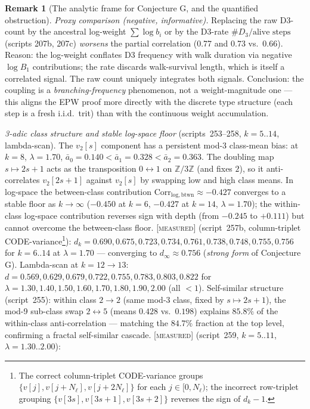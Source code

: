 \documentclass[11pt]{article}
\theoremstyle{definition}
\newtheorem{remark}[theorem]{Remark}
\newcommand{\MEASURED}{\textup{[\textsc{measured}]}}
\begin{document}
\begin{remark}[The analytic frame for Conjecture G, and the quantified
obstruction]
\emph{Proxy comparison (negative, informative).} Replacing the raw D3-count
by the ancestral log-weight $\sum \log b_i$ or by the D3-rate $\#D_3 /
\text{alive steps}$ (scripts 207b, 207c) \emph{worsens} the partial
correlation (0.77 and 0.73 vs.\ 0.66). Reason: the log-weight conflates
D3 frequency with walk duration via negative $\log B_1$ contributions;
the rate discards walk-survival length, which is itself a correlated
signal. The raw count uniquely integrates both signals. Conclusion: the
coupling is a \emph{branching-frequency} phenomenon, not a
weight-magnitude one --- this aligns the EPW proof more directly with the
discrete type structure (each step is a fresh i.i.d.\ trit) than with
the continuous weight accumulation.

\emph{3-adic class structure and stable log-space floor}
(scripts~253--258, $k{=}5..14$, lambda-scan).
The $v_2[s]$ component has a persistent mod-$3$ class-mean bias:
at $k{=}8$, $\lambda{=}1.70$, $\bar a_0 = 0.140 < \bar a_1 = 0.328 < \bar a_2 = 0.363$.
The doubling map $s\mapsto 2s{+}1$ acts as the transposition $0\leftrightarrow 1$
on $\mathbb{Z}/3\mathbb{Z}$ (and fixes $2$), so it anti-correlates
$v_2[2s{+}1]$ against $v_2[s]$ by swapping low and high class means.
In log-space the between-class contribution
$\mathrm{Corr}_{\mathrm{log,btwn}} \approx -0.427$
converges to a stable floor as $k\to\infty$ ($-0.450$ at $k{=}6$,
$-0.427$ at $k{=}14$, $\lambda{=}1.70$); the within-class log-space
contribution reverses sign with depth (from $-0.245$ to $+0.111$) but
cannot overcome the between-class floor.
\MEASURED{} (script~257b, column-triplet CODE-variance\footnote{The
correct column-triplet CODE-variance groups
$\{v[j],v[j{+}N_\ell],v[j{+}2N_\ell]\}$ for each $j\in[0,N_\ell)$;
the incorrect row-triplet grouping $\{v[3s],v[3s{+}1],v[3s{+}2]\}$
reverses the sign of $d_k - 1$.}):
$d_k = 0.690, 0.675, 0.723, 0.734, 0.761, 0.738, 0.748, 0.755, 0.756$
for $k=6..14$ at $\lambda{=}1.70$ --- converging to $d_\infty \approx 0.756$
(\emph{strong form} of Conjecture G).
Lambda-scan at $k{=}12{\to}13$: $d = 0.569, 0.629, 0.679, 0.722, 0.755,
0.783, 0.803, 0.822$ for $\lambda = 1.30, 1.40, 1.50, 1.60, 1.70, 1.80,
1.90, 2.00$ (all $< 1$).
Self-similar structure (script~255): within class $2{\to}2$ (same mod-3
class, fixed by $s\mapsto 2s{+}1$), the mod-9 sub-class swap
$2\leftrightarrow 5$ (means $0.428$ vs.\ $0.198$) explains $85.8\%$ of
the within-class anti-correlation --- matching the $84.7\%$ fraction
at the top level, confirming a fractal self-similar cascade.
\MEASURED{} (script~259, $k{=}5..11$, $\lambda{=}1.30..2.00$):

\end{remark}
\end{document}
